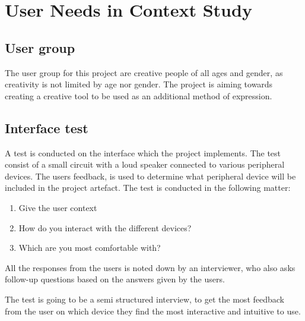\chapter{User Needs in Context Study}\label{ch:userstudy}

\section{User group}\label{sec:user}
The user group for this project are creative people of all ages and gender, as creativity is not limited by age nor gender. 
The project is aiming towards creating a creative tool to be used as an additional method of expression. 

\section{Interface test}\label{sec:interface}
A test is conducted on the interface which the project implements. The test consist of a small circuit with a loud speaker connected to various peripheral devices.
The users feedback, is used to determine what peripheral device will be included in the project artefact. 
The test is conducted in the following matter:
\begin{enumerate}
\item Give the user context
\item How do you interact with the different devices?
\item Which are you most comfortable with?
\end{enumerate}
All the responses from the users is noted down by an interviewer, who also asks follow-up questions based on the answers given by the users. 

The test is going to be a semi structured interview, to get the most feedback from the user on which device they find the most interactive and intuitive to use.

